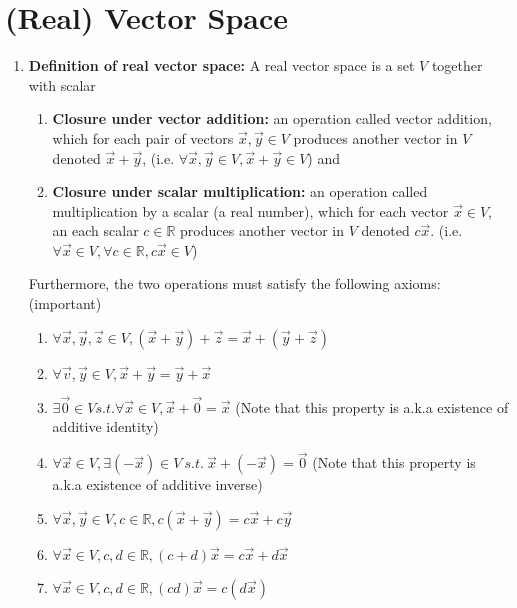 \documentclass[oneside, 12pt]{book}
\newcommand{\settag}[1]{\renewcommand{\theenumi}{#1}}
\begin{document}
\section{(Real) Vector Space}
\settag{1.1.1}
\begin{enumerate}
    \item{\textbf{Definition of real vector space:}} A real vector space is a set $V$ together with scalar
    \begin{enumerate}
        \item \textbf{Closure under vector addition:} an operation called vector addition, which for each pair of vectors $\vec{x}, \vec{y}\in V$ produces another vector in $V$ denoted $\vec{x} + \vec{y}$, (i.e. $\forall \vec{x}, \vec{y}\in V, \vec{x} + \vec{y} \in V$) and
        \item \textbf{Closure under scalar multiplication:} an operation called multiplication by a scalar (a real number), which for each vector $\vec{x}\in V$, an each scalar $c\in \mathbb{R}$ produces another vector in $V$ denoted $c\vec{x}$. (i.e. $\forall \vec{x}\in V, \forall c \in \mathbb{R}, c \vec{x} \in V$)
    \end{enumerate}
    Furthermore, the two operations must satisfy the following axioms:(important)
    \begin{enumerate}
        \item $\forall \vec{x}, \vec{y}, \vec{z} \in V, (\vec{x} + \vec{y}) + \vec{z} = \vec{x} + (\vec{y} + \vec{z})$
        \item $\forall \vec{v}, \vec{y} \in V, \vec{x} + \vec{y} = \vec{y} + \vec{x}$
        \item $\exists \vec{0} \in V s.t. \forall \vec{x} \in V, \vec{x} + \vec{0} = \vec{x}$ (Note that this property is a.k.a existence of additive identity)
        \item $\forall \vec{x} \in V, \exists (-\vec{x}) \in V~s.t.~\vec{x} + (-\vec{x}) = \vec{0}$ (Note that this property is a.k.a existence of additive inverse)
        \item $\forall \vec{x}, \vec{y} \in V, c \in \mathbb{R}, c(\vec{x} + \vec{y}) = c\vec{x} + c\vec{y}$
        \item $\forall \vec{x} \in V, c,d \in \mathbb{R}, (c + d)\vec{x} = c\vec{x} + d\vec{x}$
        \item $\forall \vec{x} \in V, c,d \in \mathbb{R}, (cd)\vec{x} = c(d\vec{x})$

\end{enumerate}
\end{enumerate}
\end{document}

